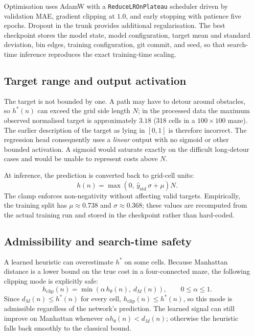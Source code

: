 Optimisation uses AdamW with a \texttt{ReduceLROnPlateau} scheduler driven by
validation MAE, gradient clipping at $1.0$, and early stopping with patience
five epochs. Dropout in the trunk provides additional regularisation. The best
checkpoint stores the model state, model configuration, target mean and
standard deviation, bin edges, training configuration, git commit, and seed, so
that search-time inference reproduces the exact training-time scaling.

\subsection{Target range and output activation}
The target is not bounded by one. A path may have to detour around obstacles,
so $h^\ast(n)$ can exceed the grid side length $N$; in the processed data the
maximum observed normalised target is approximately $3.18$ (318 cells in a
$100\times100$ maze). The earlier description of the target as lying in
$[0,1]$ is therefore incorrect. The regression head consequently uses a
\emph{linear} output with no sigmoid or other bounded activation. A sigmoid
would saturate exactly on the difficult long-detour cases and would be unable
to represent costs above $N$.

At inference, the prediction is converted back to grid-cell units:
\begin{equation}
  \hat{h}(n) = \max\!\left(0,\ \hat{y}_{\text{std}}\,\sigma + \mu\right) N.
\end{equation}
The clamp enforces non-negativity without affecting valid targets. Empirically,
the training split has $\mu\approx0.738$ and $\sigma\approx0.368$; these values
are recomputed from the actual training run and stored in the checkpoint rather
than hard-coded.

\subsection{Admissibility and search-time safety}
A learned heuristic can overestimate $h^\ast$ on some cells. Because Manhattan
distance is a lower bound on the true cost in a four-connected maze, the
following clipping mode is explicitly safe:
\begin{equation}
  h_{\text{clip}}(n) = \min\!\left(\alpha\,h_\theta(n),\ d_M(n)\right),
  \qquad 0 \le \alpha \le 1.
\end{equation}
Since $d_M(n)\le h^\ast(n)$ for every cell, $h_{\text{clip}}(n)\le h^\ast(n)$,
so this mode is admissible regardless of the network's prediction. The learned
signal can still improve on Manhattan whenever $\alpha h_\theta(n)<d_M(n)$;
otherwise the heuristic falls back smoothly to the classical bound.

